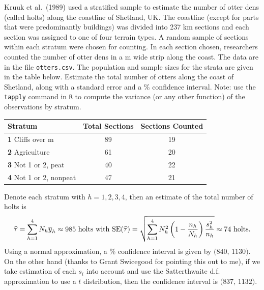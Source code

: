 \documentclass[usenames,dvipsnames]{homework}
\begin{document}
\begin{longproblem}
  Kruuk et al.~(1989) used a stratified sample to estimate the number of otter dens (called holts) along the coastline of Shetland, UK.  The coastline (except for parts that were predominantly buildings) was divided into 237 \unit[5]{km} sections and each section was assigned to one of four terrain types.  A random sample of sections within each stratum were chosen for counting. In each section chosen, researchers counted the number of otter dens in a \unit[110]{m} wide strip along the coast.  The data are in the file \texttt{otters.csv}.  The population and sample sizes for the strata are given in the table below.  Estimate the total number of otters along the coast of Shetland, along with a standard error and a \unit[95]{\%} confidence interval.  Note: use the \texttt{tapply} command in \texttt{R} to compute the variance (or any other function) of the observations by stratum. 
  \begin{center}
  \renewcommand{\arraystretch}{1.3}
  \begin{tabular}{l c c}
  Stratum			      & Total Sections  & Sections Counted \\ \hline
  \textbf{1} Cliffs over \unit[10]{m} & 89              & 19               \\
  \textbf{2} Agriculture              & 61              & 20               \\
  \textbf{3} Not 1 or 2, peat         & 40              & 22               \\
  \textbf{4} Not 1 or 2, nonpeat      & 47              & 21               \\ \hline
  \end{tabular}
  \end{center}
\end{longproblem}
\begin{solution}
  Denote each stratum with $h=1,2,3,4$, then an estimate of the total number of holts is
  $$
    \widehat\tau = \sum_{h=1}^4 N_h\overline y_h \approx 985\text{ holts with }\mathrm{SE}(\widehat\tau) = \sqrt{\sum_{h=1}^4 N_h^2\left(1-\frac{n_h}{N_h}\right) \frac{s_h^2}{n_h}} \approx 74\text{ holts.}
  $$
  Using a normal approximation, a \unit[95]{\%} confidence interval is given by $\big(840,\,1130\big)$. On the other hand (thanks to Grant Swicegood for pointing this out to me), if we take estimation of each $s_i$ into account and use the Satterthwaite d.f. approximation to use a $t$ distribution, then the confidence interval is $\big(837,\, 1132\big)$. 
\end{solution}
\end{document}
